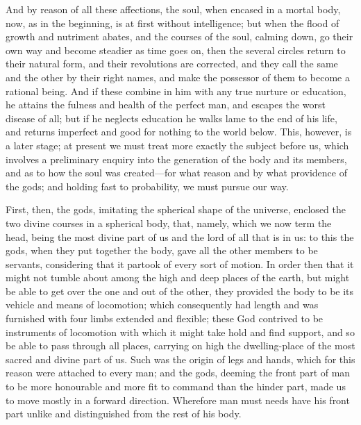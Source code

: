 And by reason of all these affections, the soul, when encased in a mortal
body, now, as in the beginning, is at first without intelligence; but when
the flood of growth and nutriment abates, and the courses of the soul,
calming down, go their own way and become steadier as time goes on, then
the several circles return to their natural form, and their revolutions
are corrected, and they call the same and the other by their right names,
and make the possessor of them to become a rational being. And if these
combine in him with any true nurture or education, he attains the fulness
and health of the perfect man, and escapes the worst disease of all; but
if he neglects education he walks lame to the end of his life, and returns
imperfect and good for nothing to the world below. This, however, is a
later stage; at present we must treat more exactly the subject before us,
which involves a preliminary enquiry into the generation of the body and
its members, and as to how the soul was created—for what reason and
by what providence of the gods; and holding fast to probability, we must
pursue our way.

First, then, the gods, imitating the spherical shape of the universe,
enclosed the two divine courses in a spherical body, that, namely, which
we now term the head, being the most divine part of us and the lord of all
that is in us: to this the gods, when they put together the body, gave all
the other members to be servants, considering that it partook of every
sort of motion. In order then that it might not tumble about among the
high and deep places of the earth, but might be able to get over the one
and out of the other, they provided the body to be its vehicle and means
of locomotion; which consequently had length and was furnished with four
limbs extended and flexible; these God contrived to be instruments of
locomotion with which it might take hold and find support, and so be able
to pass through all places, carrying on high the dwelling-place of the
most sacred and divine part of us. Such was the origin of legs and hands,
which for this reason were attached to every man; and the gods, deeming
the front part of man to be more honourable and more fit to command than
the hinder part, made us to move mostly in a forward direction. Wherefore
man must needs have his front part unlike and distinguished from the rest
of his body.


